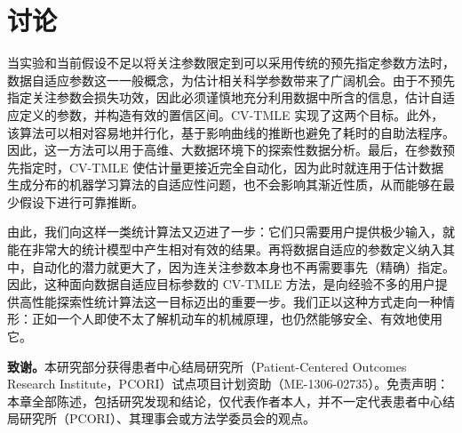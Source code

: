 \section{讨论}

当实验和当前假设不足以将关注参数限定到可以采用传统的预先指定参数方法时，数据自适应参数这一一般概念，为估计相关科学参数带来了广阔机会。由于不预先指定关注参数会损失功效，因此必须谨慎地充分利用数据中所含的信息，估计自适应定义的参数，并构造有效的置信区间。CV-TMLE 实现了这两个目标。此外，该算法可以相对容易地并行化，基于影响曲线的推断也避免了耗时的自助法程序。因此，这一方法可以用于高维、大数据环境下的探索性数据分析。最后，在参数预先指定时，CV-TMLE 使估计量更接近完全自动化，因为此时就连用于估计数据生成分布的机器学习算法的自适应性问题，也不会影响其渐近性质，从而能够在最少假设下进行可靠推断。

由此，我们向这样一类统计算法又迈进了一步：它们只需要用户提供极少输入，就能在非常大的统计模型中产生相对有效的结果。再将数据自适应的参数定义纳入其中，自动化的潜力就更大了，因为连关注参数本身也不再需要事先（精确）指定。因此，这种面向数据自适应目标参数的 CV-TMLE 方法，是向经验不多的用户提供高性能探索性统计算法这一目标迈出的重要一步。我们正以这种方式走向一种情形：正如一个人即使不太了解机动车的机械原理，也仍然能够安全、有效地使用它。

\noindent\textbf{致谢。}本研究部分获得患者中心结局研究所（Patient-Centered Outcomes Research Institute，PCORI）试点项目计划资助（ME-1306-02735）。免责声明：本章全部陈述，包括研究发现和结论，仅代表作者本人，并不一定代表患者中心结局研究所（PCORI）、其理事会或方法学委员会的观点。
\clearpage
\endgroup
